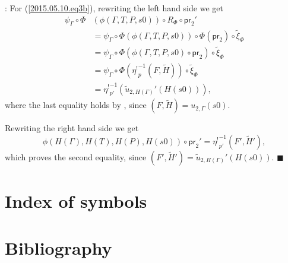 \documentclass[12pt]{article}
\numberwithin{equation}{section}
\newenvironment{myproof}{{\bf Proof}:}{$\blacksquare$ \vskip 5mm }
\newcommand{\wt}{\widetilde}
\newcommand{\etashriek}{\eta^!}
\newcommand{\etaunshriek}{{\etashriek}^{-1}}
\newcommand{\pr}{\mathsf{pr}}
\begin{document}
\begin{myproof}
For (\ref{2015.05.10.eq3b}), rewriting the left hand side we get
%
\begin{align*}
  \psi_{\Gamma}\circ \Phi&(\phi(\Gamma,T,P,s0))\circ R_{\Phi}\circ \pr_2'  \\
    & = \psi_{\Gamma}\circ \Phi(\phi(\Gamma,T,P,s0))\circ \Phi(\pr_2)\circ \wt{\xi}_{\Phi} \\
    & = \psi_{\Gamma}\circ \Phi(\phi(\Gamma,T,P,s0)\circ \pr_2)\circ \wt{\xi}_{\Phi} \\
    & = \psi_{\Gamma}\circ \Phi(\etaunshriek_p(F,\wt{H}))\circ \wt{\xi}_{\Phi} \\
    & = \etaunshriek_{p'}(\wt{u}_{2,H(\Gamma)}'(H(s0))),
\end{align*}
%
where the last equality holds by \cite[Lemma 6.2(2)]{fromunivwithPi}, since
$(F,\wt{H})=u_{2,\Gamma}(s0)$.

Rewriting the right hand side we get
%
$$\phi(H(\Gamma),H(T),H(P),H(s0))\circ \pr_2'=\etaunshriek_{p'}(F',\wt{H}'),$$
%
which proves the second equality, since
$(F',\wt{H}')=\wt{u}_{2,H(\Gamma)}'(H(s0))$.
\end{myproof}

\section{Index of symbols}
\printglossaries

\section{Bibliography}


\end{document}

